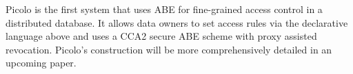 \newline\newline
\textsf{Picolo} is the first system that uses \textsf{ABE} for fine-grained access control in a distributed database. It allows data owners to set access rules via the declarative language above and uses a \textsf{CCA2} secure \textsf{ABE} scheme with proxy assisted revocation. \textsf{Picolo}'s construction will be more comprehensively detailed in an upcoming paper.

